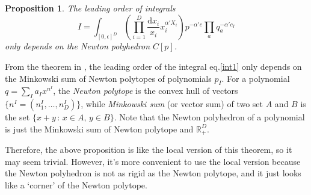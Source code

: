 \documentclass[12pt]{article}
\theoremstyle{definition}
\theoremstyle{plain}
\newtheorem{pro}[para]{Proposition}
\newcommand{\dif}{\mathrm{d}} %
\begin{document}
\begin{pro}\label{pro:1}
The leading order of integrals
\[
	I=\int_{[0,\epsilon]^D} \left(\prod_{i=1}^D\frac{\dif x_i}{x_i}x_i^{\alpha' X_i}\right)
	p^{-\alpha' c} \prod_a q_a^{-\alpha' c_I}
\]
only depends on the Newton polyhedron $C[p]$.
\end{pro}

From the theorem in \cite{Arkani-Hamed:2019mrd}, the leading order of the integral eq.\eqref{int1} 
only depends on the Minkowski sum of Newton polytopes of polynomials $p_I$. %
For a polynomial $q=\sum_I a_I x^{n^I}$, the {\textit{Newton polytope}} is the convex hull of vectors 
$\{n^I=(n^I_1,\dots,n^I_D)\}$, while \textit{Minkowski sum} (or vector sum) of two set $A$ and $B$ is the set $\{x+y\,:\,x\in A,\,y\in B\}$. Note that the Newton polyhedron of a polynomial is just the Minkowski sum of Newton polytope and $\mathbb R_+^D$.

Therefore, the above proposition is like the local version of this theorem, 
so it may seem trivial. However, it's more convenient to use the local version because 
the Newton polyhedron is not as rigid as the Newton polytope, 
and it just looks like a `corner' of the Newton polytope.

\end{document}
